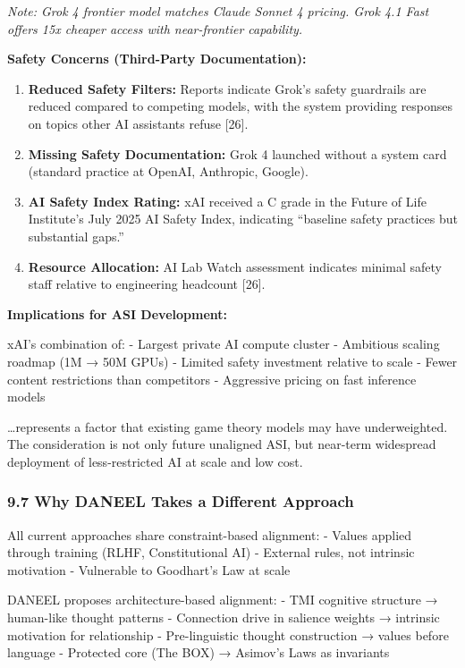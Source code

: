 \documentclass[
  11pt,
]{article}
\begin{document}
\emph{Note: Grok 4 frontier model matches Claude Sonnet 4 pricing. Grok
4.1 Fast offers 15x cheaper access with near-frontier capability.}

\textbf{Safety Concerns (Third-Party Documentation):}

\begin{enumerate}
\def\labelenumi{\arabic{enumi}.}
\item
  \textbf{Reduced Safety Filters:} Reports indicate Grok's safety
  guardrails are reduced compared to competing models, with the system
  providing responses on topics other AI assistants refuse {[}26{]}.
\item
  \textbf{Missing Safety Documentation:} Grok 4 launched without a
  system card (standard practice at OpenAI, Anthropic, Google).
\item
  \textbf{AI Safety Index Rating:} xAI received a C grade in the Future
  of Life Institute's July 2025 AI Safety Index, indicating ``baseline
  safety practices but substantial gaps.''
\item
  \textbf{Resource Allocation:} AI Lab Watch assessment indicates
  minimal safety staff relative to engineering headcount {[}26{]}.
\end{enumerate}

\textbf{Implications for ASI Development:}

xAI's combination of: - Largest private AI compute cluster - Ambitious
scaling roadmap (1M → 50M GPUs) - Limited safety investment relative to
scale - Fewer content restrictions than competitors - Aggressive pricing
on fast inference models

\ldots represents a factor that existing game theory models may have
underweighted. The consideration is not only future unaligned ASI, but
near-term widespread deployment of less-restricted AI at scale and low
cost.

\subsubsection{9.7 Why DANEEL Takes a Different
Approach}\label{why-daneel-takes-a-different-approach}

All current approaches share constraint-based alignment: - Values
applied through training (RLHF, Constitutional AI) - External rules, not
intrinsic motivation - Vulnerable to Goodhart's Law at scale

DANEEL proposes architecture-based alignment: - TMI cognitive structure
→ human-like thought patterns - Connection drive in salience weights →
intrinsic motivation for relationship - Pre-linguistic thought
construction → values before language - Protected core (The BOX) →
Asimov's Laws as invariants
\end{document}
